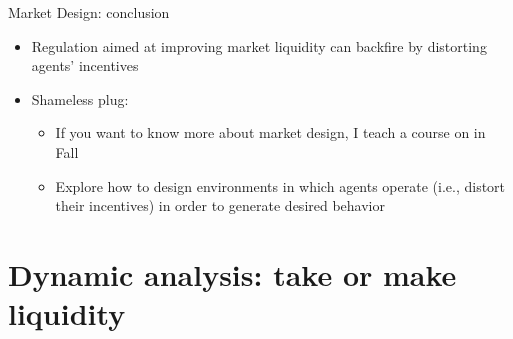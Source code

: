 \documentclass[english,10pt
,aspectratio=169
]{beamer}
\begin{document}
\begin{frame}{Market Design: conclusion}
	\begin{itemize}
		\item Regulation aimed at improving market liquidity can backfire by distorting agents' incentives
		\item Shameless plug:
		\begin{itemize}
			\item If you want to know more about market design, I teach a course on  in Fall
			\item Explore how to design environments in which agents operate (i.e., distort their incentives) in order to generate desired behavior
		\end{itemize}
	\end{itemize}
\end{frame}



\section{Dynamic analysis: take or make liquidity}
\end{document}
